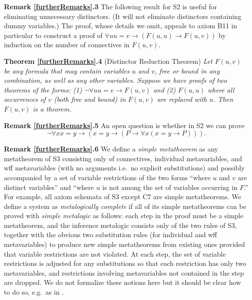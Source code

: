 \documentclass[leqno]{article}
\begin{document}
     {\bf Remark \ref{furtherRemarks}.3} The following result for S2 is useful for eliminating
unnecessary distinctors.  (It will not eliminate distinctors containing dummy
variables.)  The proof, whose details we omit, appeals to axiom B11 in
particular to construct a proof of $\forall uu=v\rightarrow (F(u,u)\rightarrow
F(u,v))$ by induction on the number of connectives in $F(u,v)$.

  {\bf Theorem \ref{furtherRemarks}.4} (Distinctor Reduction Theorem)
\hspace{.5em} {\em Let $F(u,v)$ be any formula that may contain variables $u$
and $v$, free or bound in any combination, as well as any other variables.
Suppose we have proofs of two theorems of the forms:  (1) $\lnot \forall
uu=v\rightarrow F(u,v)$ and (2) $F(u,u)$ where {\rm all} occurrences of $v$
(both free and bound) in $F(u,v)$ are replaced with $u$.  Then $F(u,v)$ is a
theorem.}

     {\bf Remark \ref{furtherRemarks}.5} An open question is whether in S2 we can prove
\setcounter{equation}{14}
\renewcommand{\theequation}{B\arabic{equation}}
\begin{equation} %
   \lnot \forall xx=y\rightarrow (x=y\rightarrow (P\rightarrow \forall
x(x=y\rightarrow P))).
\end{equation}

     {\bf Remark \ref{furtherRemarks}.6} We define a {\em simple metatheorem} as any metatheorem
of S3 consisting only of connectives, individual metavariables, and wff
metavariables (with no arguments i.e.\ no explicit substitutions) and
possibly accompanied by a set of variable restrictions of the two forms
``where $u$ and $v$ are distinct variables'' and ``where $u$ is not among the
set of variables occurring in $F$.''  For example, all axiom schemata of S3
except C7 are simple metatheorems.  We define a system as {\em metalogically
complete} if all of its simple metatheorems can be proved with {\em simple
metalogic} as follows:  each step in the proof must be a simple metatheorem,
and the inference metalogic consists only of the two rules of S3, together
with the obvious two substitution rules (for individual and wff
metavariables) to produce new simple metatheorems from existing ones provided
that variable restrictions are not violated.  At each step, the set
of variable restrictions is adjusted for any substitutions so that each
restriction has only two metavariables, and restrictions involving
metavariables not contained in the step are dropped.  We do not formalize
these notions here but it should be clear how to do so, e.g.\ as in
\cite{Tarski}.
\end{document}
